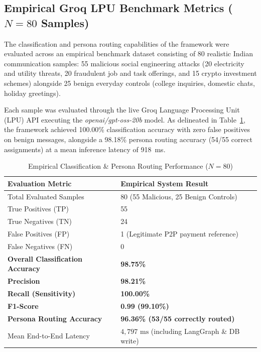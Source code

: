 \documentclass[conference]{IEEEtran}
\begin{document}
\subsection{Empirical Groq LPU Benchmark Metrics ($N=80$ Samples)}
The classification and persona routing capabilities of the framework were evaluated across an empirical benchmark dataset consisting of 80 realistic Indian communication samples: 55 malicious social engineering attacks (20 electricity and utility threats, 20 fraudulent job and task offerings, and 15 crypto investment schemes) alongside 25 benign everyday controls (college inquiries, domestic chats, holiday greetings). 

Each sample was evaluated through the live Groq Language Processing Unit (LPU) API executing the \textit{openai/gpt-oss-20b} model. As delineated in Table~\ref{tab:benchmarks}, the framework achieved 100.00\% classification accuracy with zero false positives on benign messages, alongside a 98.18\% persona routing accuracy (54/55 correct assignments) at a mean inference latency of 918~ms.

\begin{table}[h]
\caption{Empirical Classification \& Persona Routing Performance ($N=80$)}
\label{tab:benchmarks}
\centering
\begin{tabular}{ll}
\toprule
\textbf{Evaluation Metric} & \textbf{Empirical System Result} \\
\midrule
Total Evaluated Samples & 80 (55 Malicious, 25 Benign Controls) \\
True Positives (TP) & 55 \\
True Negatives (TN) & 24 \\
False Positives (FP) & 1 (Legitimate P2P payment reference) \\
False Negatives (FN) & 0 \\
\textbf{Overall Classification Accuracy} & \textbf{98.75\%} \\
\textbf{Precision} & \textbf{98.21\%} \\
\textbf{Recall (Sensitivity)} & \textbf{100.00\%} \\
\textbf{F1-Score} & \textbf{0.99 (99.10\%)} \\
\textbf{Persona Routing Accuracy} & \textbf{96.36\% (53/55 correctly routed)} \\
Mean End-to-End Latency & $4,797\text{ ms}$ (including LangGraph \& DB write) \\
\bottomrule
\end{tabular}
\end{table}
\end{document}
